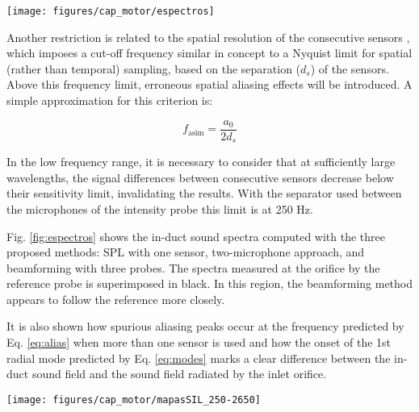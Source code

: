\begin{figure*}[tb!]
\centering
\texttt{[image: figures/cap\_motor/espectros]}
\caption{Inlet in-duct sound spectra estimated by the three considered methods (SPL, beamforming and two-microphone) and orifice sound intensity spectrum as measured by the B\&K intensity probe.}
\label{fig:espectros}
\end{figure*}

Another restriction is related to the spatial resolution of the consecutive sensors \cite{seybert1988two}, which imposes a cut-off frequency similar in concept to a Nyquist limit for spatial (rather than temporal) sampling, based on the separation ($d_s$) of the sensors. Above this frequency limit, erroneous spatial aliasing effects will be introduced. A simple approximation for this criterion is:

\begin{equation}\label{eq:alias}
	f_\text{asim}=\frac{a_0}{2 d_s}
\end{equation}

In the low frequency range, it is necessary to consider that at sufficiently large wavelengths, the signal differences between consecutive sensors decrease below their sensitivity limit, invalidating the results. With the separator used between the microphones of the intensity probe this limit is at 250 Hz.

Fig. \ref{fig:espectros} shows the in-duct sound spectra computed with the three proposed methods: SPL with one sensor, two-microphone approach, and beamforming with three probes. The spectra measured at the orifice by the reference probe is superimposed in black. In this region, the beamforming method appears to follow the reference more closely.

It is also shown how spurious aliasing peaks occur at the frequency predicted by Eq. \ref{eq:alias} when more than one sensor is used and how the onset of the 1st radial mode predicted by Eq. \ref{eq:modes} marks a clear difference between the in-duct sound field and the sound field radiated by the inlet orifice.

\begin{figure*}[b!]
\centering
\texttt{[image: figures/cap\_motor/mapasSIL\_250-2650]}
\caption{In duct SIL maps of the compressor noise estimated by the beamforming method (top left), twomicrophone method (top right) and SIL map of orifice noise as measured by the probe (top center), including correlations between the three measurements (bottom).}
\label{fig:mapasSIL_250-2650}
\end{figure*}

